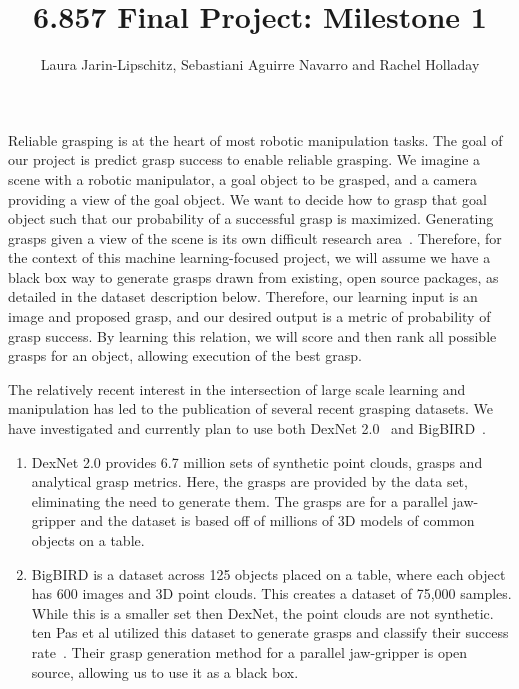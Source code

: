 \documentclass[letterpaper, 10 pt]{article}
\begin{document}
\title{6.857 Final Project: Milestone 1}
\author{Laura Jarin-Lipschitz, Sebastiani Aguirre Navarro and Rachel Holladay}
\maketitle

Reliable grasping is at the heart of most robotic manipulation tasks. 
The goal of our project is predict grasp success to enable reliable grasping. 
We imagine a scene with a robotic manipulator, a goal object to be grasped, and a camera providing a view of the goal object.
We want to decide how to grasp that goal object such that our probability of a successful grasp is maximized.
Generating grasps given a view of the scene is its own difficult research area~\cite{pinto2016supersizing,lenz2015deep,jiang2011efficient}.
Therefore, for the context of this machine learning-focused project, we will assume we have a black box way to generate grasps drawn from existing, open source packages, as detailed in the dataset description below.
Therefore, our learning input is an image and proposed grasp, and our desired output is a metric of probability of grasp success. 
By learning this relation, we will score and then rank all possible grasps for an object, allowing execution of the best grasp. 

The relatively recent interest in the intersection of large scale learning and manipulation has led to the publication of several recent grasping datasets. 
We have investigated and currently plan to use both DexNet 2.0~\cite{mahler2017dex} and BigBIRD~\cite{singh2014bigbird}. 
\begin{enumerate}
   \item DexNet 2.0 provides 6.7 million sets of synthetic point clouds, grasps and analytical grasp metrics. Here, the grasps are provided by the data set, eliminating the need to generate them. The grasps are for a parallel jaw-gripper and the dataset is based off of millions of 3D models of common objects on a table.  
   \item BigBIRD is a dataset across 125 objects placed on a table, where each object has 600 images and 3D point clouds. This creates a dataset of 75,000 samples. While this is a smaller set then DexNet, the point clouds are not synthetic. ten Pas et al utilized this dataset to generate grasps and classify their success rate~\cite{pas2017grasp}. Their grasp generation method for a parallel jaw-gripper is open source, allowing us to use it as a black box. 
\end{enumerate}
\end{document}
